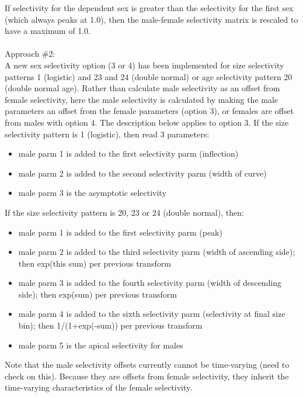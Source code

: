 If selectivity for the dependent sex is greater than the selectivity for the first sex (which always peaks at 1.0), then the male-female selectivity matrix is rescaled to have a maximum of 1.0.\\
\\
Approach \#2:\\
A new sex selectivity option (3 or 4) has been implemented for size selectivity patterns 1 (logistic) and 23 and 24 (double normal) or age selectivity pattern 20 (double normal age).  Rather than calculate male selectivity as an offset from female selectivity, here the male selectivity is calculated by making the male parameters an offset from the female parameters (option 3), or females are offset from males with option 4.  The description below applies to option 3. If the size selectivity pattern is 1 (logistic), then read 3 parameters:
\begin{itemize}
	\item male parm 1 is added to the first selectivity parm (inflection)
	\item male parm 2 is added to the second selectivity parm (width of curve)
	\item male parm 3 is the asymptotic selectivity
\end{itemize}

If the size selectivity pattern is 20, 23 or 24 (double normal), then:
\begin{itemize}
	\item male parm 1 is added to the first selectivity parm (peak)
	\item male parm 2 is added to the third selectivity parm (width of ascending side); then exp(this sum) per previous transform
	\item male parm 3 is added to the fourth selectivity parm (width of descending side); then exp(sum) per previous transform
	\item male parm 4 is added to the sixth selectivity parm (selectivity at final size bin); then 1/(1+exp(-sum)) per previous transform
	\item male parm 5 is the apical selectivity for males
\end{itemize}

Note that the male selectivity offsets currently cannot be time-varying (need to check on this).  Because they are offsets from female selectivity, they inherit the time-varying characteristics of the female selectivity.



